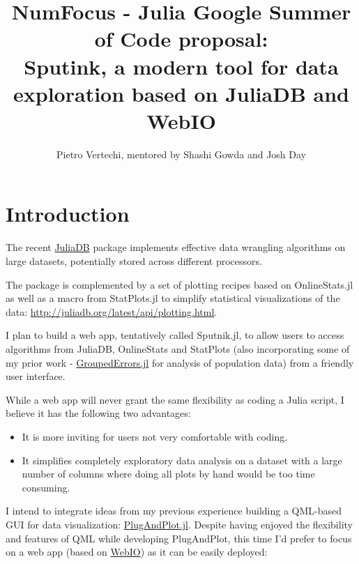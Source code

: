 \documentclass[10pt,a4paper]{report}
\begin{document}
\title{NumFocus - Julia Google Summer of Code proposal:\\
Sputink, a modern tool for data exploration based on JuliaDB and WebIO}
\author{Pietro Vertechi, mentored by Shashi Gowda and Josh Day}


\maketitle

\section*{Introduction}

The recent \href{https://github.com/JuliaComputing/JuliaDB.jl}{JuliaDB} package implements effective data wrangling algorithms on large datasets, potentially stored across different processors.

The package is complemented by a set of plotting recipes based on OnlineStats.jl  as well as a macro from StatPlots.jl to simplify statistical visualizations of the data: \url{http://juliadb.org/latest/api/plotting.html}.

I plan to build a web app, tentatively called Sputnik.jl, to allow users to access algorithms from JuliaDB, OnlineStats and StatPlots (also incorporating some of my prior work - \href{https://github.com/piever/GroupedErrors.jl}{GroupedErrors.jl} for analysis of population data) from a friendly user interface.

While a web app will never grant the same flexibility as coding a Julia script, I believe it has the following two advantages:

\begin{itemize}
    \item It is more inviting for users not very comfortable with coding.
    \item It simplifies completely exploratory data analysis on a dataset with a large number of columns where doing all plots by hand would be too time consuming.
\end{itemize}

I intend to integrate ideas from my previous experience building a QML-based GUI for data visualization: \href{https://github.com/piever/PlugAndPlot.jl}{PlugAndPlot.jl}. Despite having enjoyed the flexibility and features of QML while developing PlugAndPlot, this time I'd prefer to focus on a web app (based on \href{https://github.com/JuliaGizmos/WebIO.jl}{WebIO}) as it can be easily deployed:
\end{document}
